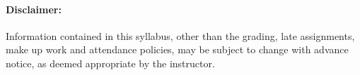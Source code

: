 \documentclass[12pt, letterpaper]{article}
\begin{document}
\paragraph{Disclaimer:}
Information contained in this syllabus, other than the grading, late assignments, make up work and attendance policies, may be subject to change with advance notice, as deemed appropriate by the instructor.
\end{document}
